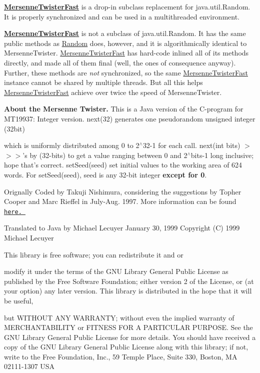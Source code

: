{\bf \hyperlink{classjenes_1_1utils_1_1_mersenne_twister_fast}{MersenneTwisterFast}} is a drop-in subclass replacement for java.util.Random. It is properly synchronized and can be used in a multithreaded environment.

{\bf \hyperlink{classjenes_1_1utils_1_1_mersenne_twister_fast}{MersenneTwisterFast}} is not a subclass of java.util.Random. It has the same public methods as \hyperlink{classjenes_1_1utils_1_1_random}{Random} does, however, and it is algorithmically identical to MersenneTwister. \hyperlink{classjenes_1_1utils_1_1_mersenne_twister_fast}{MersenneTwisterFast} has hard-code inlined all of its methods directly, and made all of them final (well, the ones of consequence anyway). Further, these methods are {\em not\/} synchronized, so the same \hyperlink{classjenes_1_1utils_1_1_mersenne_twister_fast}{MersenneTwisterFast} instance cannot be shared by multiple threads. But all this helps \hyperlink{classjenes_1_1utils_1_1_mersenne_twister_fast}{MersenneTwisterFast} achieve over twice the speed of MersenneTwister.

{\bf About the Mersenne Twister. } This is a Java version of the C-program for MT19937: Integer version. next(32) generates one pseudorandom unsigned integer (32bit)

which is uniformly distributed among 0 to 2$^\wedge$32-1 for each call. next(int bits) $>$$>$$>$'s by (32-bits) to get a value ranging between 0 and 2$^\wedge$bits-1 long inclusive; hope that's correct. setSeed(seed) set initial values to the working area of 624 words. For setSeed(seed), seed is any 32-bit integer {\bf except for 0}.

Orignally Coded by Takuji Nishimura, considering the suggestions by Topher Cooper and Marc Rieffel in July-Aug. 1997. More information can be found \href{http://www.math.keio.ac.jp/matumoto/emt.html}{\tt here. }

Translated to Java by Michael Lecuyer January 30, 1999 Copyright (C) 1999 Michael Lecuyer 

This library is free software; you can redistribute it and or

modify it under the terms of the GNU Library General Public License as published by the Free Software Foundation; either version 2 of the License, or (at your option) any later version. This library is distributed in the hope that it will be useful,

but WITHOUT ANY WARRANTY; without even the implied warranty of MERCHANTABILITY or FITNESS FOR A PARTICULAR PURPOSE. See the GNU Library General Public License for more details. You should have received a copy of the GNU Library General Public License along with this library; if not, write to the Free Foundation, Inc., 59 Temple Place, Suite 330, Boston, MA 02111-1307 USA 


